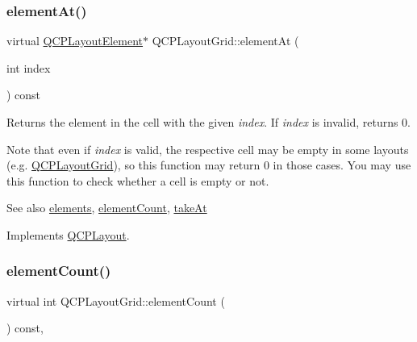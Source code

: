 \subsubsection{\texorpdfstring{element\+At()}{elementAt()}\hspace{0.1cm}{\footnotesize\ttfamily [2/2]}}
{\footnotesize\ttfamily virtual \hyperlink{class_q_c_p_layout_element}{Q\+C\+P\+Layout\+Element}$\ast$ Q\+C\+P\+Layout\+Grid\+::element\+At (\begin{DoxyParamCaption}\item[{int}]{index }\end{DoxyParamCaption}) const\hspace{0.3cm}{\ttfamily [virtual]}}

Returns the element in the cell with the given {\itshape index}. If {\itshape index} is invalid, returns 0.

Note that even if {\itshape index} is valid, the respective cell may be empty in some layouts (e.\+g. \hyperlink{class_q_c_p_layout_grid}{Q\+C\+P\+Layout\+Grid}), so this function may return 0 in those cases. You may use this function to check whether a cell is empty or not.

\begin{DoxySeeAlso}{See also}
\hyperlink{class_q_c_p_layout_grid_a7d5b968b4cf57393e9e387976d91f8f7}{elements}, \hyperlink{class_q_c_p_layout_grid_a9a8942aface780a02445ebcf14c48513}{element\+Count}, \hyperlink{class_q_c_p_layout_grid_a17dd220234d1bbf8835abcc666384d45}{take\+At} 
\end{DoxySeeAlso}


Implements \hyperlink{class_q_c_p_layout_afa73ca7d859f8a3ee5c73c9b353d2a56}{Q\+C\+P\+Layout}.

\mbox{\label{class_q_c_p_layout_grid_a9a8942aface780a02445ebcf14c48513}} 
\subsubsection{\texorpdfstring{element\+Count()}{elementCount()}\hspace{0.1cm}{\footnotesize\ttfamily [1/2]}}
{\footnotesize\ttfamily virtual int Q\+C\+P\+Layout\+Grid\+::element\+Count (\begin{DoxyParamCaption}{ }\end{DoxyParamCaption}) const\hspace{0.3cm}{\ttfamily [inline]}, {\ttfamily [virtual]}}


